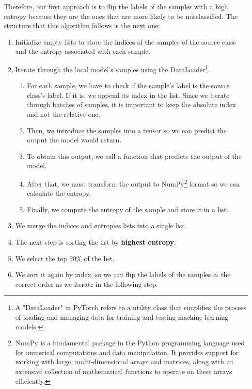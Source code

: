 Therefore, our first approach is to flip the labels of the samples with a high entropy because they are the ones that are more likely to be misclassified. The structure that this algorithm follows is the next one:%
\begin{enumerate}
        \item Initialize empty lists to store the indices of the samples of the source class and the entropy associated with each sample.
        \item Iterate through the local model's samples using the DataLoader\footnote{A "DataLoader" in PyTorch refers to a utility class that simplifies the process of loading and managing data for training and testing machine learning models.}.
                \begin{enumerate}
                        \item For each sample, we have to check if the sample's label is the source class's label. If it is, we append its index in the list. Since we iterate through batches of samples, it is important to keep the absolute index and not the relative one.
                        \item Then, we introduce the samples into a tensor so we can predict the output the model would return.
                        \item To obtain this output, we call a function that predicts the output of the model.%
                        \item After that, we must transform the output to NumPy\footnote{NumPy is a fundamental package in the Python programming language used for numerical computations and data manipulation. It provides support for working with large, multi-dimensional arrays and matrices, along with an extensive collection of mathematical functions to operate on these arrays efficiently.} format so we can calculate the entropy.
                        \item Finally, we compute the entropy of the sample and store it in a list.
                \end{enumerate}
        \item We merge the indices and entropies lists into a single list.
        \item The next step is sorting the list by \textbf{highest entropy}.
        \item We select the top 50\% of the list.
        \item We sort it again by index, so we can flip the labels of the samples in the correct order as we iterate in the following step.

\end{enumerate}
